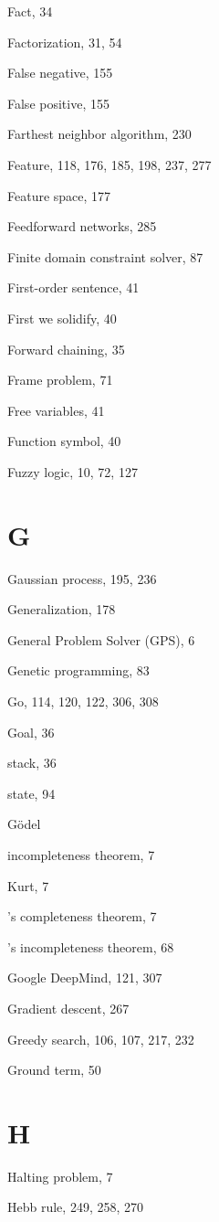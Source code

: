 \documentclass[10pt]{book}
\begin{document}
\begin{center}
Fact, 34

Factorization, 31, 54

False negative, 155

False positive, 155

Farthest neighbor algorithm, 230

Feature, 118, 176, 185, 198, 237, 277

Feature space, 177

Feedforward networks, 285

Finite domain constraint solver, 87

First-order sentence, 41

First we solidify, 40

Forward chaining, 35

Frame problem, 71

Free variables, 41

Function symbol, 40

Fuzzy logic, 10, 72, 127

\section{G}

Gaussian process, 195, 236

Generalization, 178

General Problem Solver (GPS), 6

Genetic programming, 83

Go, 114, 120, 122, 306, 308

Goal, 36

stack, 36

state, 94

Gödel

incompleteness theorem, 7

Kurt, 7

's completeness theorem, 7

's incompleteness theorem, 68

Google DeepMind, 121, 307

Gradient descent, 267

Greedy search, 106, 107, 217, 232

Ground term, 50

\section{H}

Halting problem, 7

Hebb rule, 249, 258, 270


\end{center}
\end{document}
